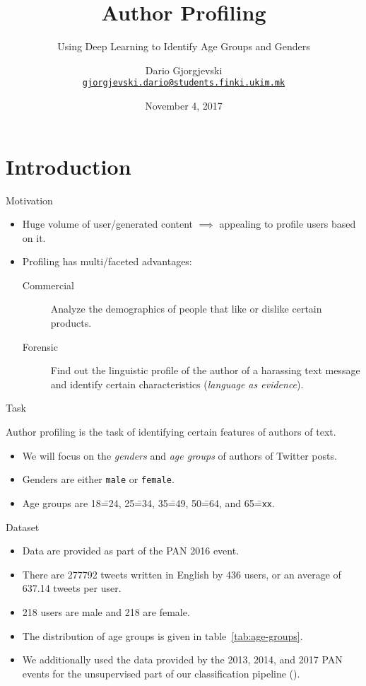 \documentclass[usepdftitle=false]{beamer}
\title{Author Profiling}%
\subtitle{Using Deep Learning to Identify Age Groups and Genders}%
\author[Dario Gj.]{%
  Dario Gjorgjevski\\%
  \href{mailto:gjorgjevski.dario@students.finki.ukim.mk}%
  {\nolinkurl{gjorgjevski.dario@students.finki.ukim.mk}}%
}%
\institute[FCSE]{%
  Faculty of Computer Science and Engineering\\%
  Ss.\ Cyril and Methodius University in Skopje%
}%
\date{November 4, 2017}
\begin{document}
\begin{frame}
  \titlepage%
\end{frame}

\section{Introduction}

\begin{frame}{Motivation}
  \begin{itemize}
  \item Huge volume of user\-/generated content \(\implies\) appealing
    to profile users based on it.
  \item Profiling has multi\-/faceted advantages:
    \begin{description}
    \item[Commercial] Analyze the demographics of people that like or
      dislike certain products.
    \item[Forensic] Find out the linguistic profile of the author of a
      harassing text message and identify certain characteristics
      (\emph{language as evidence}).
    \end{description}
  \end{itemize}
\end{frame}

\begin{frame}{Task}
  \begin{definition}
    Author profiling is the task of identifying certain features of
    authors of text.
  \end{definition}
  \begin{itemize}
  \item We will focus on the \emph{genders} and \emph{age groups} of
    authors of Twitter posts.
  \item Genders are either \Verb+male+ or \Verb+female+.
  \item Age groups are \num{18}\==\num{24}, \num{25}\==\num{34},
    \num{35}\==\num{49}, \num{50}\==\num{64}, and
    \num{65}\==\Verb+xx+.
  \end{itemize}
\end{frame}

\begin{frame}{Dataset}
  \begin{itemize}
  \item Data are provided as part of the PAN 2016 event\footnotemark.
  \item There are \num{277792} tweets written in English by \num{436}
    users, or an average of \num{637.14} tweets per user.
  \item \num{218} users are male and \num{218} are female.
  \item The distribution of age groups is given in
    table~\autoref{tab:age-groups}.
  \item We additionally used the data provided by the 2013, 2014, and
    2017 PAN events for the unsupervised part of our classification
    pipeline ().
  \end{itemize}
\end{frame}
\end{document}
